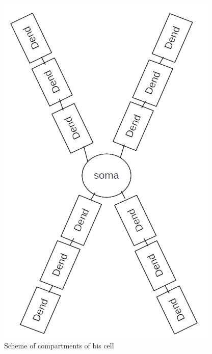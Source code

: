\documentclass[a4paper,12pt]{article}
\begin{document}
\begin{figure}[h]
	\centering
	\includegraphics{bis_structure.png}
	\caption{Scheme of compartments of bis cell}
	\label{fig:bis_structures}
\end{figure}
\end{document}
